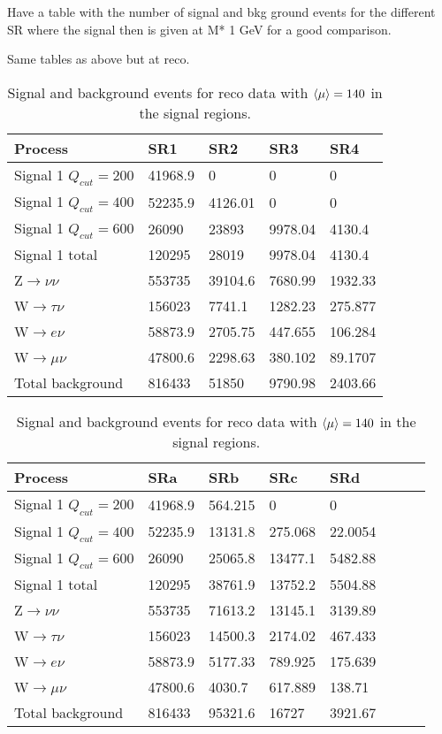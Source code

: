 Have a table with the number of signal and bkg ground events for the different SR where the signal then is given at M* 1 GeV for a good comparison.

Same tables as above but at reco.


\begin{table}[ht]
\begin{center}
\begin{tabular}{|l|l|l|l|l|}
\hline
Process & SR1  & SR2 & SR3 & SR4 \\ \hline
Signal 1 $Q_{cut}=200$&41968.9&0&0&0 \\
Signal 1 $Q_{cut}=400$&52235.9&4126.01&0&0 \\
Signal 1 $Q_{cut}=600$&26090&23893&9978.04&4130.4 \\
Signal 1 total&120295&28019&9978.04&4130.4 \\
Z$\rightarrow\nu\nu$&553735&39104.6&7680.99&1932.33 \\
W$\rightarrow\tau\nu$&156023&7741.1&1282.23&275.877 \\
W$\rightarrow e\nu$&58873.9&2705.75&447.655&106.284 \\
W$\rightarrow\mu\nu$&47800.6&2298.63&380.102&89.1707 \\
Total background&816433&51850&9790.98&2403.66 \\ \hline
\end{tabular}
\caption{Signal and background events for reco data with $\left<\mu\right>=140$ in the signal regions.}
\label{tab:srreco1}
\end{center}
\end{table}

\begin{table}[ht]
\begin{center}
\begin{tabular}{|l|l|l|l|l|l|l|l|}
\hline
Process & SRa  & SRb & SRc & SRd \\ \hline
Signal 1 $Q_{cut}=200$&41968.9&564.215&0&0 \\
Signal 1 $Q_{cut}=400$&52235.9&13131.8&275.068&22.0054 \\
Signal 1 $Q_{cut}=600$&26090&25065.8&13477.1&5482.88 \\
Signal 1 total&120295&38761.9&13752.2&5504.88 \\
Z$\rightarrow\nu\nu$&553735&71613.2&13145.1&3139.89 \\
W$\rightarrow\tau\nu$&156023&14500.3&2174.02&467.433 \\
W$\rightarrow e\nu$&58873.9&5177.33&789.925&175.639 \\
W$\rightarrow\mu\nu$&47800.6&4030.7&617.889&138.71 \\
Total background&816433&95321.6&16727&3921.67 \\ \hline
\end{tabular}
\caption{Signal and background events for reco data with $\left<\mu\right>=140$ in the signal regions.}
\label{tab:srreco2}
\end{center}
\end{table}
\newpage
